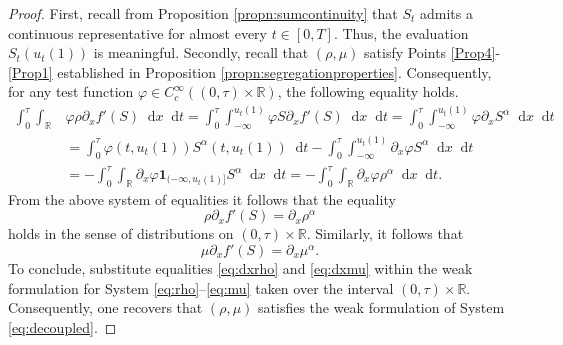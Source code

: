 \documentclass[10pt,a4paper]{amsart}
\newcommand{\R}{\mathbb{R}}
\newcommand{\diff}{\mathop{} \mathrm{d}}
\newcommand{\one}{\mathbf{1}}
\begin{document}
\begin{proof}
First, recall from Proposition \ref{propn:sumcontinuity} that $S_t$ admits a continuous representative for almost every $t \in [0,T]$. 
Thus, the evaluation $S_t(u_t(1))$ is meaningful.
Secondly, recall that $(\rho,\mu)$ satisfy Points \ref{Prop4}- \ref{Prop1} established in Proposition \ref{propn:segregationproperties}. 
Consequently, for any test function $\varphi \in C_c^\infty ((0,\tau)\times \R)$, the following equality holds.
\begin{align*}
    \int_0^{\tau}\int_{\R} & \varphi \rho \partial_x f'(S)   \diff x \diff t = \int_0^{\tau}\int_{-\infty}^{u_t(1)}\varphi S\partial_x f'(S) \diff x \diff t =  \int_0^{\tau}\int_{-\infty}^{u_t(1)} \varphi \partial_x S^\alpha  \diff x \diff t\\
    & = \int_0^{\tau}\varphi(t,u_t(1)) S^\alpha(t,u_t(1)) \diff t- \int_0^{\tau}\int_{-\infty}^{u_t(1)} \partial_x \varphi S^\alpha   \diff x \diff t\\
    & = - \int_0^{\tau}\int_{\R} \partial_x \varphi \one_{(-\infty,u_t(1)]} S^\alpha  \diff x \diff t= - \int_0^{\tau}\int_{\R} \partial_x \varphi \rho^\alpha \diff x \diff t.
\end{align*}
From the above system of equalities it follows that the equality 
\begin{equation}\label{eq:dxrho}
\rho\partial_x f'(S) = \partial_x \rho^\alpha
\end{equation}
holds in the sense of distributions on $(0,\tau) \times \R$.
Similarly, it follows that
\begin{equation}\label{eq:dxmu}
\mu\partial_x f'(S) = \partial_x \mu^\alpha.
\end{equation}
To conclude, substitute equalities \eqref{eq:dxrho} and \eqref{eq:dxmu} within the weak formulation for System  \eqref{eq:rho}--\eqref{eq:mu} taken over the interval $(0,\tau)\times \R$.
Consequently, one recovers that $(\rho,\mu)$ satisfies the weak formulation of System \eqref{eq:decoupled}.
\end{proof}
\end{document}
